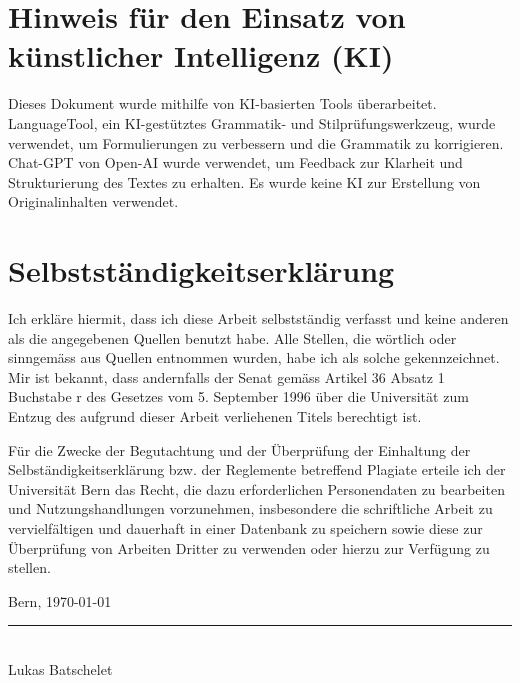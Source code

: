 \documentclass{template}
\begin{document}


\clearpage



\clearpage



\clearpage



\clearpage



\clearpage



\newpage
\printglossary


\newpage
{}
\printbibliography[heading=bibintoc]

\newpage

\section*{Hinweis für den Einsatz von künstlicher Intelligenz (KI)}

Dieses Dokument wurde mithilfe von KI-basierten Tools überarbeitet. LanguageTool, ein KI-gestütztes Grammatik- und Stilprüfungswerkzeug, wurde verwendet, um Formulierungen zu verbessern und die Grammatik zu korrigieren. Chat-GPT von Open-AI wurde verwendet, um Feedback zur Klarheit und Strukturierung des Textes zu erhalten. Es wurde keine KI zur Erstellung von Originalinhalten verwendet.


\newpage

\section*{Selbstständigkeitserklärung}

Ich erkläre hiermit, dass ich diese Arbeit selbstständig verfasst und keine anderen als die angegebenen Quellen benutzt habe. Alle Stellen, die wörtlich oder sinngemäss aus Quellen entnommen wurden, habe ich als solche gekennzeichnet. Mir ist bekannt, dass andernfalls der Senat gemäss Artikel 36 Absatz 1 Buchstabe r des Gesetzes vom 5. September 1996 über die Universität zum Entzug des aufgrund dieser Arbeit verliehenen Titels berechtigt ist.

Für die Zwecke der Begutachtung und der Überprüfung der Einhaltung der Selbständigkeitserklärung bzw. der Reglemente betreffend Plagiate erteile ich der Universität Bern das Recht, die dazu erforderlichen Personendaten zu bearbeiten und Nutzungshandlungen vorzunehmen, insbesondere die schriftliche Arbeit zu vervielfältigen und dauerhaft in einer Datenbank zu speichern sowie diese zur Überprüfung von Arbeiten Dritter zu verwenden oder hierzu zur Verfügung zu stellen.

\vspace{8cm}

\noindent Bern, \today

\vspace{2cm}

\noindent\rule{6cm}{0.4pt} \\
\noindent Lukas Batschelet




\clearpage
{}
   
   
\end{document}
